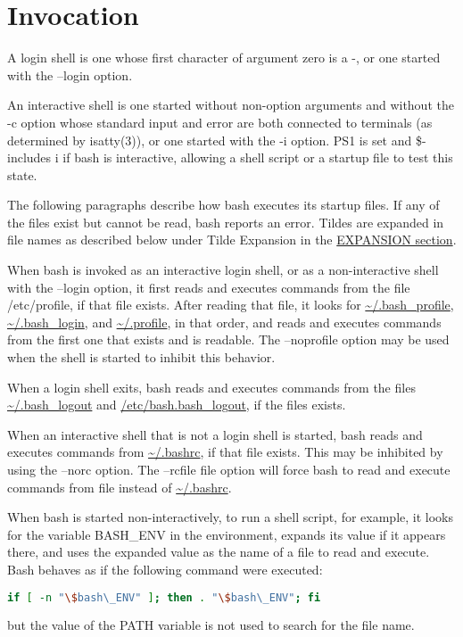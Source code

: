 \documentclass[11pt]{article}
\begin{document}
\section{Invocation}
\label{sec:invocation}
A login shell is one whose first character of argument zero is a -, or one started with the --login option.

An interactive shell is one started without non-option arguments and without the -c option whose standard input and error are both connected to terminals (as determined by isatty(3)), or one started with the -i option. PS1 is set and \$- includes i if bash is interactive, allowing a shell script or a startup file to test this state.

The following paragraphs describe how bash executes its startup files. If any of the files exist but cannot be read, bash reports an error. Tildes are expanded in file names as described below under Tilde Expansion in the \hyperref[sec:expansion]{EXPANSION section}.

When bash is invoked as an interactive login shell, or as a non-interactive shell with the --login option, it first reads and executes commands from the file /etc/profile, if that file exists. After reading that file, it looks for \url{~/.bash_profile}, \url{~/.bash_login}, and \url{~/.profile}, in that order, and reads and executes commands from the first one that exists and is readable. The --noprofile option may be used when the shell is started to inhibit this behavior.

When a login shell exits, bash reads and executes commands from the files \url{~/.bash_logout} and \url{/etc/bash.bash_logout}, if the files exists.

When an interactive shell that is not a login shell is started, bash reads and executes commands from \url{~/.bashrc}, if that file exists. This may be inhibited by using the --norc option. The --rcfile file option will force bash to read and execute commands from file instead of \url{~/.bashrc}.

When bash is started non-interactively, to run a shell script, for example, it looks for the variable BASH\_ENV in the environment, expands its value if it appears there, and uses the expanded value as the name of a file to read and execute. Bash behaves as if the following command were executed:
\begin{lstlisting}[language=bash]
    if [ -n "\$bash\_ENV" ]; then . "\$bash\_ENV"; fi
\end{lstlisting}
but the value of the PATH variable is not used to search for the file name.
\end{document}
